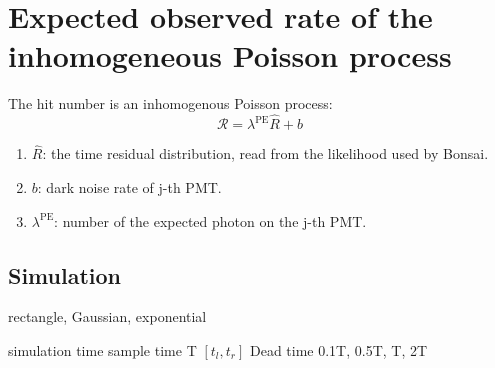 \section{Expected observed rate of the inhomogeneous Poisson process}
The hit number is an inhomogenous Poisson process:
	\[\mathcal{R}=\lambda^\mathrm{PE}\hat{R}+b\]
	\begin{enumerate}
	\item $\hat{R}$: the time residual distribution, read from the likelihood used by Bonsai.
	\item $b$: dark noise rate of j-th PMT.
	\item $\lambda^\mathrm{PE}$: number of the expected photon on the j-th PMT.
	\end{enumerate}
\subsection{Simulation}
rectangle, Gaussian, exponential

simulation time
sample time T $[t_l,t_r]$
Dead time 0.1T, 0.5T, T, 2T

